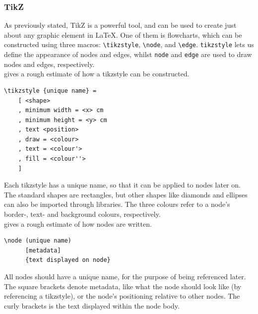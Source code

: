 \subsubsection{TikZ}

As previously stated, TikZ is a powerful tool, and can be used to create just about any graphic element in LaTeX. One of them is flowcharts, which can be constructed using three macros: \texttt{\textbackslash tikzstyle}, \texttt{\textbackslash node}, and \texttt{\textbackslash edge}. \texttt{tikzstyle} lets us define the appearance of nodes and edges, whilst \texttt{node} and \texttt{edge} are used to draw nodes and edges, respectively. \\

 gives a rough estimate of how a tikzstyle can be constructed. \\

\begin{lstlisting}[caption={Rough description of tikzstyle attributes.}, captionpos=b, label={Rough description of tikzstyle attributes.}]
\tikzstyle {unique name} =
    [ <shape>
    , minimum width = <x> cm
    , minimum height = <y> cm
    , text <position>
    , draw = <colour>
    , text = <colour'>
    , fill = <colour''>
    ]
\end{lstlisting}

Each tikzstyle has a unique name, so that it can be applied to nodes later on.  The standard shapes are rectangles, but other shapes like diamonds and ellipses can also be imported through libraries. The three colours refer to a node's border-, text- and background colours, respectively. \\

 gives a rough estimate of how nodes are written. \\

\begin{lstlisting}[caption={How nodes are written with TikZ.}, captionpos=b, label={How nodes are written with TikZ.}]
\node (unique name)
      [metadata]
      {text displayed on node}
\end{lstlisting}

All nodes should have a unique name, for the purpose of being referenced later. The square brackets denote metadata, like what the node should look like (by referencing a tikzstyle), or the node's positioning relative to other nodes. The curly brackets is the text displayed within the node body. \\

